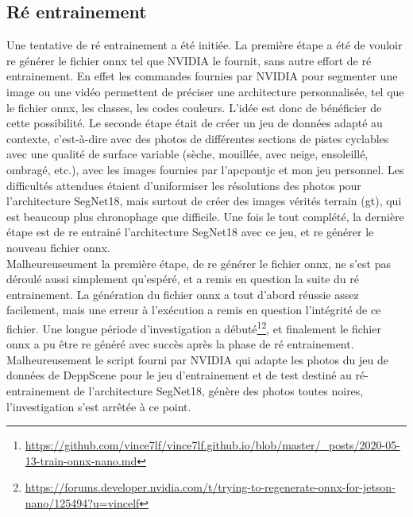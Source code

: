 \subsection{Ré entrainement}
\noindent Une tentative de ré entrainement a été initiée. La première étape a été de vouloir re générer le fichier \acrshort{onnx} tel que NVIDIA le fournit, sans autre effort de ré entrainement. En effet les commandes fournies par NVIDIA pour segmenter une image ou une vidéo permettent de préciser une architecture personnalisée, tel que le fichier \acrshort{onnx}, les classes, les codes couleurs. L'idée est donc de bénéficier de cette possibilité. Le seconde étape était de créer un jeu de données adapté au contexte, c'est-à-dire avec des photos de différentes sections de pistes cyclables avec une qualité de surface variable (sèche, mouillée, avec neige, ensoleillé, ombragé, etc.), avec les images fournies par l'\acrshort{apcpontjc} et mon jeu personnel. Les difficultés attendues étaient d'uniformiser les résolutions des photos pour l'architecture SegNet18, mais surtout de créer des images vérités terrain (\acrshort{gt}), qui est beaucoup plus chronophage que difficile. Une fois le tout complété, la dernière étape est de re entrainé l'architecture SegNet18 avec ce jeu, et re générer le nouveau fichier \acrshort{onnx}. 
\vspace{\baselineskip}
\\
\noindent Malheureuseument la première étape, de re générer le fichier \acrshort{onnx}, ne s'est pas déroulé aussi simplement qu'espéré, et a remis en question la suite du ré entrainement. La génération du fichier \acrshort{onnx} a tout d'abord réussie assez facilement, mais une erreur à l'exécution a remis en question l'intégrité de ce fichier. Une longue période d'investigation a débuté\footnote{\url{https://github.com/vince7lf/vince7lf.github.io/blob/master/_posts/2020-05-13-train-onnx-nano.md}}\footnote{\url{https://forums.developer.nvidia.com/t/trying-to-regenerate-onnx-for-jetson-nano/125494?u=vincelf}}, et finalement le fichier \acrshort{onnx} a pu être re généré avec succès après la phase de ré entrainement. Malheureusement le script fourni par NVIDIA qui adapte les photos du jeu de données de DeppScene pour le jeu d'entrainement et de test destiné au ré-entrainement de l'architecture SegNet18, génère des photos toutes noires, l'investigation s'est arrêtée à ce point.

